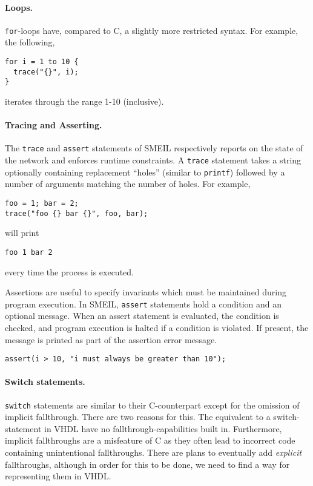\paragraph{Loops.} \texttt{for}-loops have, compared to C, a slightly more
restricted syntax. For example, the following,
\begin{lstlisting}[language=smeil]
for i = 1 to 10 {
  trace("{}", i);
}
\end{lstlisting}
iterates through the range 1-10 (inclusive).

\paragraph{Tracing and Asserting.}The {\tt trace} and {\tt assert} statements of
SMEIL respectively reports on the state of the network and enforces runtime
constraints. A {\tt trace} statement takes a string optionally containing
replacement ``holes'' (similar to {\tt printf}) followed by a number of
arguments matching the number of holes. For example,
\begin{lstlisting}[language=smeil]
foo = 1; bar = 2;
trace("foo {} bar {}", foo, bar);
\end{lstlisting}
will print
\begin{verbatim}
foo 1 bar 2
\end{verbatim}
every time the process is executed.

Assertions are useful to specify invariants which must be maintained during
program execution. In SMEIL, {\tt assert} statements hold a condition and an
optional message. When an assert statement is evaluated, the condition is
checked, and program execution is halted if a condition is violated. If present,
the message is printed as part of the assertion error message.
\begin{lstlisting}[language=smeil]
assert(i > 10, "i must always be greater than 10");
\end{lstlisting}


\paragraph{Switch statements.} \texttt{switch} statements are similar to their
C-counterpart except for the omission of implicit fallthrough. There are two
reasons for this. The equivalent to a switch-statement in VHDL have no
fallthrough-capabilities built in. Furthermore, implicit fallthroughs are a
misfeature of C as they often lead to incorrect code containing unintentional
fallthroughs. There are plans to eventually add {\itshape explicit}
fallthroughs, although in order for this to be done, we need to find a way for
representing them in VHDL.


